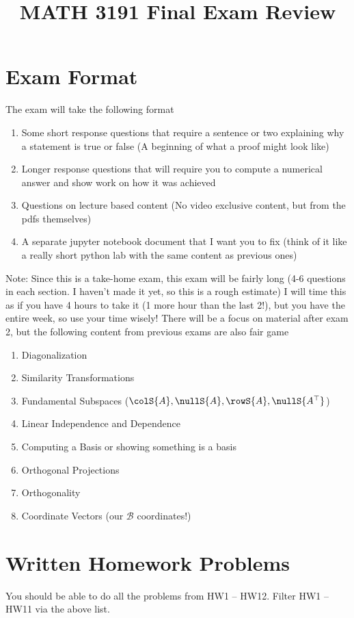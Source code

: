 \documentclass[12pt]{exam}
\title{MATH 3191 Final Exam Review}
\date{}
\begin{document}
\maketitle
\section{Exam Format}
The exam will take the following format
\begin{enumerate}
    \item Some short response questions that require a sentence or two explaining why a statement
        is true or false (A beginning of what a proof might look like)
    \item Longer response questions that will require you to compute a numerical answer and show work
        on how it was achieved
    \item Questions on lecture based content (No video exclusive content, but from the pdfs themselves)
    \item A separate jupyter notebook document that I want you to fix (think of it like a really
        short python lab with the same content as previous ones)
\end{enumerate}
Note: Since this is a take-home exam, this exam will be fairly long (4-6 questions in each section.
I haven't made it yet, so this is a rough estimate)
I will time this as if you have 4 hours to take it (1 more hour than the last 2!), but you have the
entire week, so use your time wisely! There will be a focus on material after exam 2, but the
following content from previous exams are also fair game
\begin{enumerate}
    \item Diagonalization
    \item Similarity Transformations
    \item Fundamental Subspaces ($\colS{A}, \nullS{A}, \rowS{A}, \nullS{A^\top}$)
    \item Linear Independence and Dependence
    \item Computing a Basis or showing something is a basis
    \item Orthogonal Projections
    \item Orthogonality
    \item Coordinate Vectors (our $\mathcal{B}$ coordinates!)
\end{enumerate}

\section{Written Homework Problems}
You should be able to do all the problems from HW1 -- HW12. Filter HW1 -- HW11 via the above list.
\end{document}
